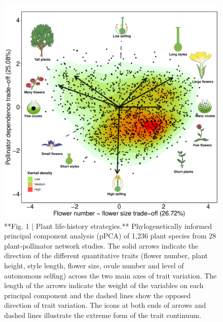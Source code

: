 \documentclass[12pt,a4paper,]{article}
\begin{document}
\begin{figure}[H]

{\centering \includegraphics{output/figures/unnamed-chunk-1-1} 

}

\caption{**Fig. 1 | Plant life-history strategies.** Phylogenetically informed principal component analysis (pPCA) of 1,236 plant species from 28 plant-pollinator network studies. The solid arrows indicate the direction of the different quantitative traits (flower number, plant height, style length, flower size, ovule number and level of autonomous selfing) across the two main axes of trait variation. The length of the arrows indicate the weight of the variables on each principal component and the dashed lines show the opposed direction of trait variation. The icons at both ends of arrows and dashed lines illustrate the extreme form of the trait continuum.}\label{fig:unnamed-chunk-1}
\end{figure}
\end{document}
